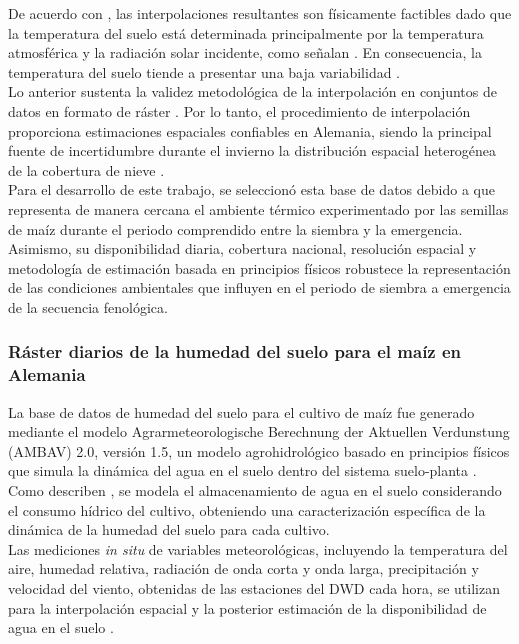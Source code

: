 De acuerdo con \cite{DWD_soiltemperature}, las interpolaciones resultantes son físicamente factibles dado que la temperatura del suelo está determinada principalmente por la temperatura atmosférica y la radiación solar incidente, como señalan \cite{BAUMBERGER_2024}. En consecuencia, la temperatura del suelo tiende a presentar una baja variabilidad \citep{DWD_soiltemperature}.\\ 


Lo anterior sustenta la validez metodológica de la interpolación en conjuntos de datos en formato de ráster \citep{Schloeder_2001}. Por lo tanto, el procedimiento de interpolación proporciona estimaciones espaciales confiables en Alemania, siendo la principal fuente de incertidumbre durante el invierno la distribución espacial heterogénea de la cobertura de nieve \citep{DWD_soiltemperature}.\\

Para el desarrollo de este trabajo, se seleccionó esta base de datos debido a que representa de manera cercana el ambiente térmico experimentado por las semillas de maíz durante el periodo comprendido entre la siembra y la emergencia. Asimismo, su disponibilidad diaria, cobertura nacional, resolución espacial y metodología de estimación basada en principios físicos robustece la representación de las condiciones ambientales que influyen en el periodo de siembra a emergencia de la secuencia fenológica.\\

\subsubsection{Ráster diarios de la humedad del suelo para el maíz en Alemania}

La base de datos de humedad del suelo para el cultivo de maíz fue generado mediante el modelo Agrarmeteorologische Berechnung der Aktuellen Verdunstung (AMBAV) 2.0, versión 1.5, un modelo agrohidrológico basado en principios físicos que simula la dinámica del agua en el suelo dentro del sistema suelo-planta \citep{DWD_soilmoisture_maize}. Como describen \cite{Herbst_2021}, se modela el almacenamiento de agua en el suelo considerando el consumo hídrico del cultivo, obteniendo una caracterización específica de la dinámica de la humedad del suelo para cada cultivo.\\

Las mediciones \textit{in situ} de variables meteorológicas, incluyendo la temperatura del aire, humedad relativa, radiación de onda corta y onda larga, precipitación y velocidad del viento, obtenidas de las estaciones del DWD cada hora, se utilizan para la interpolación espacial y la posterior estimación de la disponibilidad de agua en el suelo \citep{Herbst_2021}.\\

